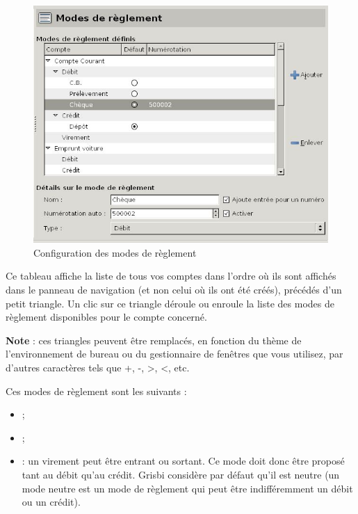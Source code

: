 \ifIllustration
\begin{figure}[ht]
\begin{center}
\includegraphics[scale=0.5]{image/screenshot/setup_modes}
\end{center}
\caption{Configuration des modes de règlement}
\label{setup-modes-img}
\end{figure}
\fi

Ce tableau affiche la liste de tous vos comptes dans l'ordre où ils sont affichés dans le panneau de navigation (et non celui où ils ont été créés), précédés d'un petit triangle. Un clic sur ce triangle déroule ou enroule la liste des modes de règlement disponibles pour le compte concerné.

\textbf{Note} : ces triangles peuvent être remplacés, en fonction du thème de l'environnement de bureau ou du gestionnaire de fenêtres que vous utilisez, par d'autres caractères tels que +, -, >, <, etc.


Ces modes de règlement sont les suivants :

\begin{itemize}
	\item {} ;
	\item {} ;
	\item {} : un virement peut être entrant ou sortant. Ce mode doit donc être proposé tant au débit qu'au crédit. Grisbi considère par défaut qu'il est neutre (un mode neutre est un mode de règlement qui peut être indifféremment un débit ou un crédit).
\end{itemize}

